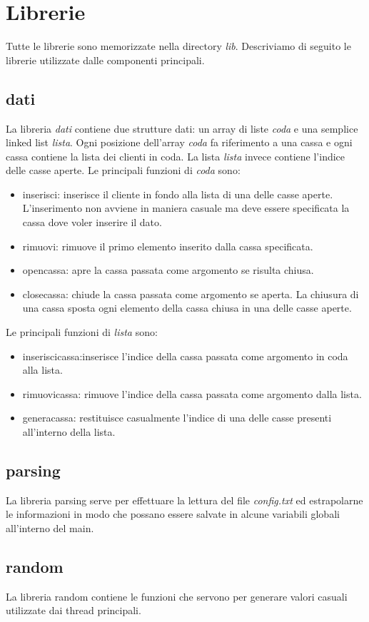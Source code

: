 \documentclass{article} %
\begin{document}
\section{Librerie}
Tutte le librerie sono memorizzate nella directory {\itshape lib}. Descriviamo di seguito le librerie utilizzate dalle componenti principali.
\subsection{dati}La libreria  {\itshape dati} contiene due strutture dati: un array di liste {\itshape coda} e una semplice linked list {\itshape lista}. Ogni posizione dell'array {\itshape coda} fa riferimento a una cassa e ogni cassa contiene la lista dei clienti in coda. La lista {\itshape lista} invece contiene l'indice delle casse aperte.
Le principali funzioni di {\itshape coda} sono:
\begin{itemize}
\item inserisci: inserisce il cliente in fondo alla lista di una delle casse aperte. L’inserimento non avviene in maniera casuale ma deve essere specificata la cassa dove voler inserire il dato. 
\item rimuovi: rimuove il primo elemento inserito dalla cassa specificata.
\item opencassa: apre la cassa passata come argomento se risulta chiusa. 
\item closecassa: chiude la cassa passata come argomento se aperta. La chiusura di una cassa sposta ogni elemento della cassa chiusa in una delle casse aperte.
\end{itemize} 
Le principali funzioni di {\itshape lista} sono:
\begin{itemize}
\item inseriscicassa:inserisce l'indice della cassa passata come argomento in coda alla lista.
\item rimuovicassa: rimuove l'indice della cassa passata come argomento dalla lista.
\item generacassa: restituisce casualmente l'indice di una delle casse presenti all'interno della lista.
\end{itemize}
\subsection{parsing} La libreria parsing serve per effettuare la lettura del file {\itshape config.txt} ed estrapolarne le informazioni in modo che possano essere salvate in alcune variabili globali all'interno del main.
 \subsection{random} La libreria random contiene le funzioni che servono per generare valori casuali utilizzate dai thread principali.
 
\end{document}
